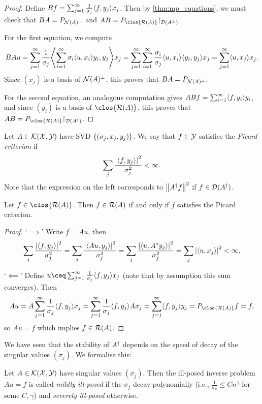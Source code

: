 \begin{proof}
    Define $Bf = \sum_{j=1}^\infty \frac1{\sigma_j} \langle f, y_j\rangle x_j$. Then by \cref{thm:mp_equations}, we must check that $BA = P_{\operatorname{\mathcal N}(A)^\perp}$ and $AB = P_{\clos{\Ran(A)}} \restr_{\Dom(A\P)}$. 
    
    For the first equation, we compute
    \[
    BAu = \sum_{j=1}^\infty \frac{1}{\sigma_j} \ang*{\sum_{i=1}^\infty \sigma_i \ang{u, x_i}y_i, y_j} x_j = \sum_{j=1}^\infty \sum_{i=1}^\infty \frac{\sigma_i}{\sigma_j} \ang{u, x_i} \ang{y_i, y_j} x_j = \sum_{j=1}^\infty \ang{u, x_j} x_j . 
    \]
    Since $(x_j)$ is a basis of $\operatorname{\mathcal N}(A)^\perp$, this proves that $BA = P_{\operatorname{\mathcal N}(A)^\perp}$. 
    
    For the second equation, an analogous computation gives $ABf = \sum_{i=1}^\infty \langle f, y_i\rangle y_i$, and since $(y_i)$ is a basis of $\clos{\Ran(A)}$, this proves that $AB = P_{\clos{\Ran(A)}}\restr_{\Dom(A\D)}$. 
\end{proof}

\begin{definition}
    Let $A \in \mathcal K(\mathcal X, \mathcal Y)$ have SVD $\qty{(\sigma_j, x_j, y_j)}$. 
    We say that $f \in \mathcal Y$ satisfies the \emph{Picard criterion} if 
    \[
    \sum_j \frac{\abs{\langle f, y_j\rangle}^2}{\sigma_j^2} < \infty. 
    \]
    Note that the expression on the left corresponds to $\norm{A^\dagger f}^2$ if $f \in \operatorname{\mathcal D}(A^\dagger)$. 
\end{definition}

\begin{theorem}
    Let $f \in \clos{\Ran(A)}$. Then $f \in \operatorname{\mathcal R}(A)$ if and only if $f$ satisfies the Picard criterion. 
\end{theorem}

\begin{proof}
    `$\implies$' Write $f = Au$, then
    \[
    \sum_j \frac{\abs{\langle f, y_j\rangle}^2}{\sigma_j^2} = \sum_j \frac{\abs{\langle Au, y_j\rangle}^2}{\sigma_j^2} = \sum_j \frac{\abs{\langle u, A^* y_j\rangle}^2}{\sigma_j^2} = \sum_j \abs{\langle u, x_j\rangle}^2 < \infty. 
    \]
    
    `$\impliedby$' Define $u \ceq  \sum_{j=1}^\infty \frac{1}{\sigma_j} \ang{f, y_j} x_j$ (note that by assumption this sum converges). Then 
    \[
    Au = A \sum_{j=1}^\infty \frac{1}{\sigma_j} \ang{f, y_j} x_j = \sum_{j=1}^\infty \frac{1}{\sigma_j} \ang{f, y_j} Ax_j = \sum_{j=1}^\infty \ang{f, y_j} y_j = P_{\clos{\Ran(A)}} f = f,
    \]
    so $Au = f$ which implies $f \in \operatorname{\mathcal R}(A)$. 
\end{proof}

We have seen that the stability of $A^\dagger$ depends on the speed of decay of the singular values $(\sigma_j)$. We formalise this:
\begin{definition}
    Let $A \in \mathcal K(\mathcal X, \mathcal Y)$ have singular values $(\sigma_j)$. Then the ill-posed inverse problem $Au = f$ is called \emph{mildly ill-posed} if the $\sigma_j$ decay polynomially (i.e., $\frac{1}{\sigma_n} \leq C n^\gamma$ for some $C, \gamma$) and \emph{severely ill-posed} otherwise. 
\end{definition}

